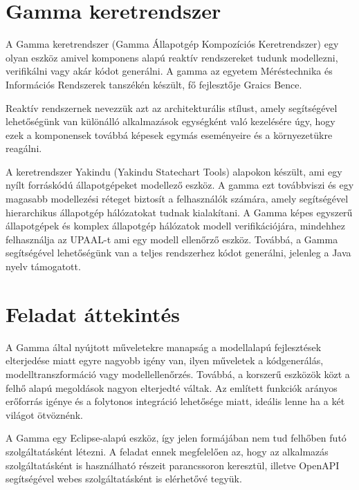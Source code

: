 \section{Gamma keretrendszer}
A Gamma keretrendszer (Gamma Állapotgép Kompozíciós Keretrendszer) egy olyan eszköz amivel komponens alapú reaktív rendszereket tudunk modellezni, verifikálni vagy akár kódot generálni. A gamma az egyetem Méréstechnika és Információs Rendszerek tanszékén készült, fő fejlesztője Graics Bence.

Reaktív rendszernek nevezzük azt az architekturális stílust, amely segítségével lehetőségünk van különálló alkalmazások egységként való kezelésére úgy, hogy ezek a komponensek továbbá képesek egymás eseményeire és a környezetükre reagálni.

A keretrendszer Yakindu (Yakindu Statechart Tools) alapokon készült, ami egy nyílt forráskódú állapotgépeket modellező eszköz. A gamma ezt továbbviszi és egy magasabb modellezési réteget biztosít a felhasználók számára, amely segítségével hierarchikus állapotgép hálózatokat tudnak kialakítani. A Gamma képes egyszerű állapotgépek és komplex állapotgép hálózatok modell verifikációjára, mindehhez felhasználja az UPAAL-t ami egy modell ellenőrző eszköz. Továbbá, a Gamma segítségével lehetőségünk van a teljes rendszerhez kódot generálni, jelenleg a Java nyelv támogatott.

\section{Feladat áttekintés}

A Gamma által nyújtott műveletekre manapság a modellalapú fejlesztések elterjedése miatt egyre nagyobb igény van, ilyen műveletek a kódgenerálás, modelltranszformáció vagy modellellenőrzés. Továbbá, a korszerű eszközök közt a felhő alapú megoldások nagyon elterjedté váltak. Az említett funkciók arányos erőforrás igénye és a folytonos integráció lehetősége miatt, ideális lenne ha a két világot ötvöznénk.


A Gamma egy Eclipse-alapú eszköz, így jelen formájában nem tud felhőben futó szolgáltatásként létezni. A feladat ennek megfelelően az, hogy az alkalmazás szolgáltatásként is használható részeit parancssoron keresztül, illetve OpenAPI segítségével webes szolgáltatásként is elérhetővé tegyük.

